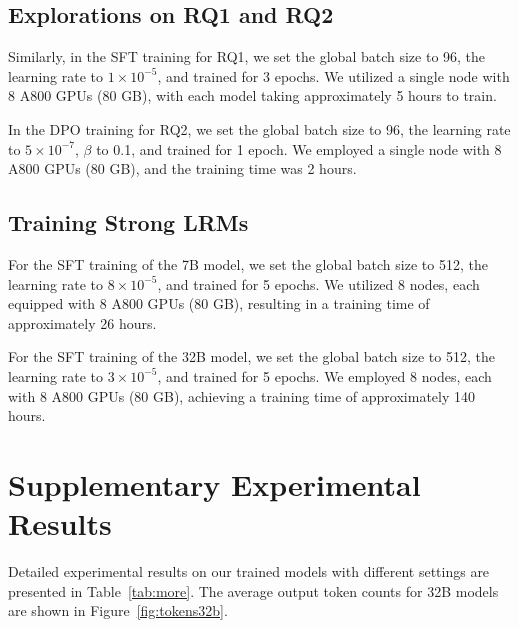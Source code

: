\documentclass{article}
\begin{document}
\subsection{Explorations on RQ1 and RQ2}
Similarly, in the SFT training for RQ1, we set the global batch size to 96, the learning rate to $1 \times 10^{-5}$, and trained for 3 epochs. We utilized a single node with 8 A800 GPUs (80 GB), with each model taking approximately 5 hours to train.

In the DPO training for RQ2, we set the global batch size to 96, the learning rate to $5 \times 10^{-7}$, $\beta$ to 0.1, and trained for 1 epoch. We employed a single node with 8 A800 GPUs (80 GB), and the training time was 2 hours.


\subsection{Training Strong LRMs}
For the SFT training of the 7B model, we set the global batch size to 512, the learning rate to $8 \times 10^{-5}$, and trained for 5 epochs. We utilized 8 nodes, each equipped with 8 A800 GPUs (80 GB), resulting in a training time of approximately 26 hours.

For the SFT training of the 32B model, we set the global batch size to 512, the learning rate to $3 \times 10^{-5}$, and trained for 5 epochs. We employed 8 nodes, each with 8 A800 GPUs (80 GB), achieving a training time of approximately 140 hours.



\section{Supplementary Experimental Results}

\label{sec:result}

Detailed experimental results on our trained models with different settings are presented in Table~\ref{tab:more}. The average output token counts for 32B models are shown in Figure~\ref{fig:tokens32b}.
\end{document}
